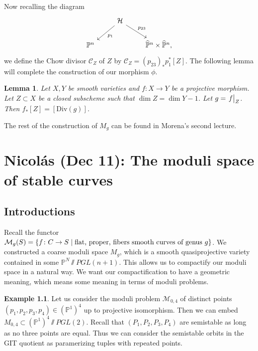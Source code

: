 \documentclass[leqno, openany]{memoir}
\newtheorem{lem}[thm]{Lemma}
\theoremstyle{definition}
\newtheorem{exm}[thm]{Example}
\theoremstyle{remark}
\theoremstyle{plain}
\theoremstyle{definition}
\theoremstyle{remark}
\renewcommand{\P}{\mathbb{P}}
\newcommand{\mc}[1]{\mathcal{#1}}
\newcommand{\mr}[1]{\mathrm{#1}}
\newcommand{\wh}[1]{\widehat{#1}}
\begin{document}
Now recalling the diagram
\begin{equation*}
\begin{tikzcd}
    & \mc{H} \arrow{dl}{p_1} \arrow{dr}{p_{23}} \\
    \P^n & & \wh{\P}^n \times \wh{\P}^n,
\end{tikzcd}
\end{equation*}
we define the Chow divisor $\mc{C}_Z$ of $Z$ by $\mc{C}_Z = {(p_{23})}_* p_1^* [Z]$. The following lemma will complete the construction of our morphism $\phi$.

\begin{lem}
    Let $X, Y$ be smooth varieties and $f \colon X \to Y$ be a projective morphism. Let $Z \subset X$ be a closed subscheme such that $\dim Z = \dim Y - 1$. Let $g = \eval{f}_Z$. Then $f_* [Z] = [\mr{Div}(g)]$.
\end{lem}

The rest of the construction of $M_g$ can be found in Morena's second lecture.

\chapter{Nicol\'as (Dec 11): The moduli space of stable curves}%
\label{cha:nicol'as_dec_11_the_moduli_space_of_stable_curves}

\section{Introductions}%
\label{sec:introductions}

Recall the functor $\mc{M}_g(S) = \qty{f \colon C \to S \mid \text{flat, proper, fibers smooth curves of genus $g$}}$. We constructed a coarse moduli space $M_g$, which is a smooth quasiprojective variety contained in some $\P^N \sslash PGL(n+1)$. This allows us to compactify our moduli space in a natural way. We want our compactification to have a geometric meaning, which means some meaning in terms of moduli problems.

\begin{exm}
    Let us consider the moduli problem $\mc{M}_{0,4}$ of distinct points $(p_1, p_2, p_3, p_4) \in { ( \P^1 ) }^4$ up to projective isomorphism. Then we can embed $M_{0,4} \subset {(\P^1)}^4 \sslash PGL(2)$. Recall that $(P_1, P_2, P_3, P_4)$ are semistable as long as no three points are equal. Thus we can consider the semistable orbits in the GIT quotient as paramerizing tuples with repeated points.
\end{exm}
\end{document}
